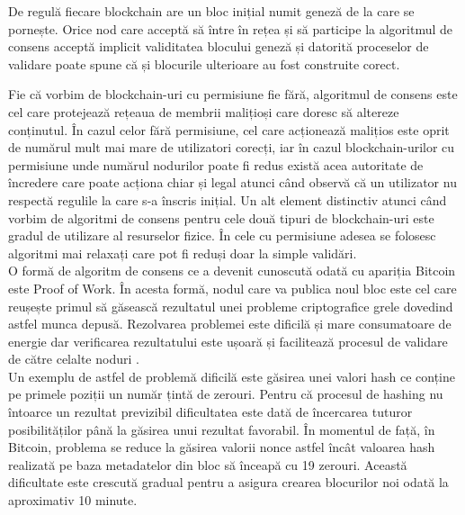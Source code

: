De regulă fiecare blockchain are un bloc inițial numit geneză de la care se pornește. Orice nod care acceptă să între în rețea și să participe la algoritmul de consens acceptă implicit validitatea blocului geneză și datorită proceselor de validare poate spune că și blocurile ulterioare au fost construite corect.\\

\clearpage

Fie că vorbim de blockchain-uri cu permisiune fie fără, algoritmul de consens este cel care protejează rețeaua de membrii malițioși care doresc să altereze conținutul. În cazul celor fără permisiune, cel care acționează malițios este oprit de numărul mult mai mare de utilizatori corecți, iar în cazul blockchain-urilor cu permisiune unde numărul nodurilor poate fi redus există acea autoritate de încredere care poate acționa chiar și legal atunci când observă că un utilizator nu respectă regulile la care s-a înscris inițial. Un alt element distinctiv atunci când vorbim de algoritmi de consens pentru cele două tipuri de blockchain-uri este gradul de utilizare al resurselor fizice. În cele cu permisiune adesea se folosesc algoritmi mai relaxați care pot fi reduși doar la simple validări.\\

O formă de algoritm de consens ce a devenit cunoscută odată cu apariția Bitcoin este Proof of Work. În acesta formă, nodul care va publica noul bloc este cel care reușește primul să găsească rezultatul unei probleme criptografice grele dovedind astfel munca depusă. Rezolvarea problemei este dificilă și mare consumatoare de energie dar verificarea rezultatului este ușoară și facilitează procesul de validare de către celalte noduri \cite{Blockchain_Overview_NIST}.\\

Un exemplu de astfel de problemă dificilă este găsirea unei valori hash ce conține pe primele poziții un număr țintă de zerouri. Pentru că procesul de hashing nu întoarce un rezultat previzibil dificultatea este dată de încercarea tuturor posibilităților până la găsirea unui rezultat favorabil. În momentul de față, în Bitcoin, problema se reduce la găsirea valorii nonce astfel încât valoarea hash realizată pe baza metadatelor din bloc să înceapă cu 19 zerouri. Această dificultate este crescută gradual pentru a asigura crearea blocurilor noi odată la aproximativ 10 minute.\\

